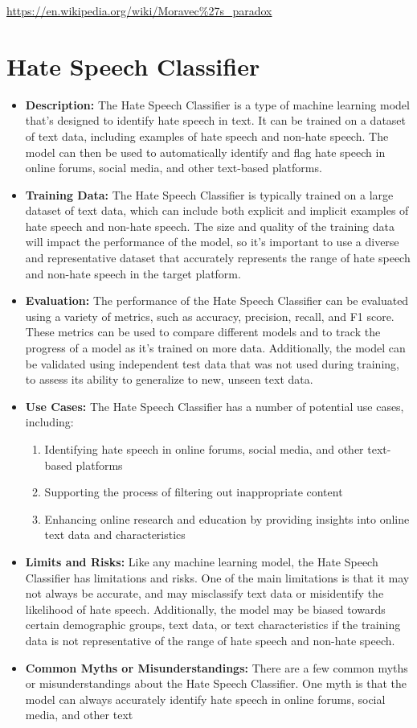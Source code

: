 \url{https://en.wikipedia.org/wiki/Moravec\%27s_paradox}

\section{Hate Speech Classifier}

\begin{itemize}
    \item \textbf{Description:} The Hate Speech Classifier is a type of machine learning model that's designed to identify hate speech in text. It can be trained on a dataset of text data, including examples of hate speech and non-hate speech. The model can then be used to automatically identify and flag hate speech in online forums, social media, and other text-based platforms.
    \item \textbf{Training Data:} The Hate Speech Classifier is typically trained on a large dataset of text data, which can include both explicit and implicit examples of hate speech and non-hate speech. The size and quality of the training data will impact the performance of the model, so it's important to use a diverse and representative dataset that accurately represents the range of hate speech and non-hate speech in the target platform.
    \item \textbf{Evaluation:} The performance of the Hate Speech Classifier can be evaluated using a variety of metrics, such as accuracy, precision, recall, and F1 score. These metrics can be used to compare different models and to track the progress of a model as it's trained on more data. Additionally, the model can be validated using independent test data that was not used during training, to assess its ability to generalize to new, unseen text data.
    \item \textbf{Use Cases:} The Hate Speech Classifier has a number of potential use cases, including:
        \begin{enumerate}  
            \item Identifying hate speech in online forums, social media, and other text-based platforms
            \item Supporting the process of filtering out inappropriate content
            \item Enhancing online research and education by providing insights into online text data and characteristics
        \end{enumerate}
    \item \textbf{Limits and Risks:} Like any machine learning model, the Hate Speech Classifier has limitations and risks. One of the main limitations is that it may not always be accurate, and may misclassify text data or misidentify the likelihood of hate speech. Additionally, the model may be biased towards certain demographic groups, text data, or text characteristics if the training data is not representative of the range of hate speech and non-hate speech.
    \item \textbf{Common Myths or Misunderstandings:} There are a few common myths or misunderstandings about the Hate Speech Classifier. One myth is that the model can always accurately identify hate speech in online forums, social media, and other text
\end{itemize}


